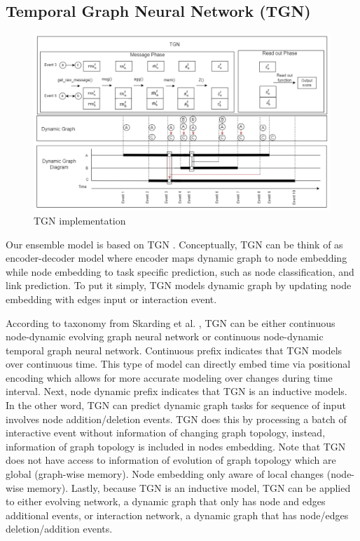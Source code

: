 \documentclass{IEEEtran}
\begin{document}
\subsection{Temporal Graph Neural Network (TGN)}
\label{sec:orgf5293b7}

\begin{figure}[htbp]
\centering
\includegraphics[width=.9\linewidth]{./images/screenshot_20220425_113310.png}
\caption{\label{TGN implementation}TGN implementation}
\end{figure}

Our ensemble model is based on TGN \cite{rossi2020temporal}. Conceptually, TGN can be think of as encoder-decoder model where encoder maps dynamic graph to node embedding while node embedding to task specific prediction, such as node classification, and link prediction. To put it simply, TGN models dynamic graph by updating node embedding with edges input or interaction event.

According to taxonomy from Skarding et al. \cite{skardingFoundationsModelingDynamic2021}, TGN can be either continuous node-dynamic evolving graph neural network or continuous node-dynamic temporal graph neural network. Continuous prefix indicates that TGN models over continuous time. This type of model can directly embed time via positional encoding which allows for more accurate modeling over changes during time interval. Next, node dynamic prefix indicates that TGN is an inductive models. In the other word, TGN can predict dynamic graph tasks for sequence of input involves node addition/deletion events. TGN does this by processing a batch of interactive event without information of changing graph topology, instead, information of graph topology is included in nodes embedding. Note that TGN does not have access to information of evolution of graph topology which are global (graph-wise memory). Node embedding only aware of local changes (node-wise memory). Lastly, because TGN is an inductive model, TGN can be applied to either evolving network, a dynamic graph that only has node and edges additional events, or interaction network, a dynamic graph that has node/edges deletion/addition events.
\end{document}
